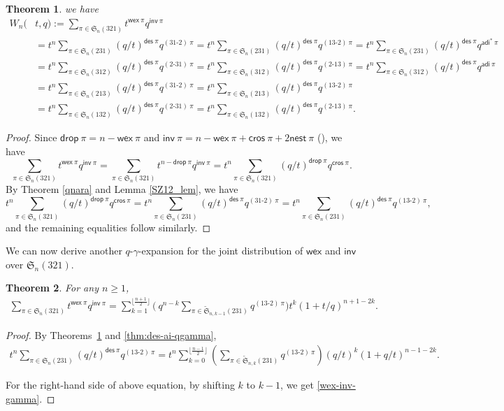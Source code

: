 \documentclass[12pt,reqno]{amsart}
\numberwithin{equation}{section}
\theoremstyle{plain}
\newtheorem{theorem}{Theorem}[section]
\theoremstyle{definition}
\def\S{\mathfrak{S}}
\def\ai{\mathsf{adi}}
\def\des{\mathsf{des}}
\def\inv{\mathsf{inv}}
\def\nest{\mathsf{nest}}
\def\cros{\mathsf{cros}}
\def\wex{\mathsf{wex}}
\def\drop{\mathsf{drop}}
\def\cab{31\text{-}2}
\def\bca{2\text{-}31}
\def\acb{13\text{-}2}
\def\bac{2\text{-}13}
\begin{document}
\begin{theorem}\label{HZthwex}
we have
\begin{align*}
W_n(&t, q):=\sum_{\pi\in\S_n(321)}t^{\wex\:\pi}q^{\inv\:\pi}\\
&=t^n\sum_{\pi\in\S_n(231)}(q/t)^{\des\:\pi}q^{(\cab)\:\pi}=t^n\sum_{\pi\in\S_n(231)}(q/t)^{\des\:\pi}q^{(\acb)\:\pi}=t^n\sum_{\pi\in\S_n(231)}(q/t)^{\des\:\pi}q^{\ai^*\:\pi}\\
&=t^n\sum_{\pi\in\S_n(312)}(q/t)^{\des\:\pi}q^{(\bca)\:\pi}=t^n\sum_{\pi\in\S_n(312)}(q/t)^{\des\:\pi}q^{(\bac)\:\pi}=t^n\sum_{\pi\in\S_n(312)}(q/t)^{\des\:\pi}q^{\ai\:\pi}\\
&=t^n\sum_{\pi\in\S_n(213)}(q/t)^{\des\:\pi}q^{(\cab)\:\pi}=t^n\sum_{\pi\in\S_n(213)}(q/t)^{\des\:\pi}q^{(\acb)\:\pi}\\
&=t^n\sum_{\pi\in\S_n(132)}(q/t)^{\des\:\pi}q^{(\bca)\:\pi}=t^n\sum_{\pi\in\S_n(132)}(q/t)^{\des\:\pi}q^{(\bac)\:\pi}.
\end{align*}





\end{theorem}

\begin{proof}
Since $\drop\:\pi=n-\wex\:\pi$ and $\inv\:\pi=n-\wex\:\pi+\cros\:\pi+2\nest\:\pi$ (\cite[Eq. (40)]{SZ10}), we have
\begin{equation*}
\sum_{\pi\in \S_n(321)} t^{\wex\:\pi}q^{\inv\:\pi}=\sum_{\pi\in \S_n(321)} t^{n-\drop\:\pi}q^{\inv\:\pi}
=t^n\sum_{\pi\in \S_n(321)} ({q}/{t})^{\drop\:\pi}q^{\cros\:\pi}.
\end{equation*}
By Theorem \ref{qnara} and Lemma \ref{SZ12_lem}, we have
$$t^n\sum_{\pi\in \S_n(321)} ({q}/{t})^{\drop\:\pi}q^{\cros\:\pi}=
t^n\sum_{\pi\in \S_n(231)} ({q}/{t})^{\des\:\pi}q^{(\cab)\:\pi}=t^n\sum_{\pi\in \S_n(231)} ({q}/{t})^{\des\:\pi}q^{(\acb)\:\pi},$$
and the remaining equalities follow similarly.

\end{proof}

We can now derive another $q$-$\gamma$-expansion for the joint distribution of $\wex$ and $\inv$ over $\S_n(321)$.
\begin{theorem}\label{qwex}
For any $n\geq 1$,
\begin{align}\label{wex-inv-gamma}
\sum_{\pi\in \S_{n}(321)}t^{\wex\:\pi}q^{\inv\:\pi}=\sum_{k=1}^{\lfloor\frac{n+1}{2}\rfloor}\biggl(\:q^{n-k}\sum_{\pi\in \widetilde{\S}_{n,k-1}(231)}q^{(\acb)\:\pi}\biggr)t^k(1+t/q)^{n+1-2k}.
\end{align}
\end{theorem}
\begin{proof}
By Theorems~\ref{HZthwex} and \ref{thm:des-ai-qgamma},
\begin{align*}
t^n\sum_{\pi\in \S_n(231)} ({q}/{t})^{\des\:\pi}q^{(\acb)\:\pi}
=t^n\sum_{k=0}^{\lfloor\frac{n-1}{2}\rfloor}\left(\sum_{\pi\in\widetilde{\S}_{n, k}(231)} {q^{(\acb)\:\pi}}\right)(q/t)^k(1+q/t)^{n-1-2k}.
\end{align*}

For the right-hand side of above equation,  by shifting $k$ to $k-1$, we get \eqref{wex-inv-gamma}.
\end{proof}
\end{document}
